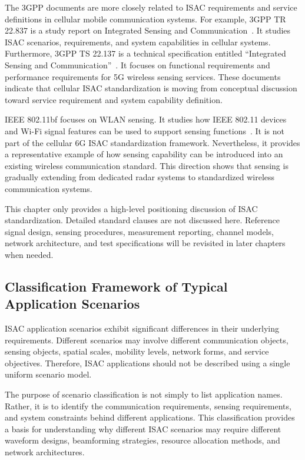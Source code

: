 The 3GPP documents are more closely related to ISAC requirements and service definitions in cellular mobile communication systems.
For example, 3GPP TR 22.837 is a study report on Integrated Sensing and Communication~\cite{3GPP_TR_22837}.
It studies ISAC scenarios, requirements, and system capabilities in cellular systems.
Furthermore, 3GPP TS 22.137 is a technical specification entitled ``Integrated Sensing and Communication''~\cite{3GPP_TS_22137}.
It focuses on functional requirements and performance requirements for 5G wireless sensing services.
These documents indicate that cellular ISAC standardization is moving from conceptual discussion toward service requirement and system capability definition.

IEEE 802.11bf focuses on \acs{WLAN} sensing.
It studies how IEEE 802.11 devices and Wi-Fi signal features can be used to support sensing functions~\cite{IEEE_80211bf}.
It is not part of the cellular 6G ISAC standardization framework.
Nevertheless, it provides a representative example of how sensing capability can be introduced into an existing wireless communication standard.
This direction shows that sensing is gradually extending from dedicated radar systems to standardized wireless communication systems.

This chapter only provides a high-level positioning discussion of ISAC standardization.
Detailed standard clauses are not discussed here.
Reference signal design, sensing procedures, measurement reporting, channel models, network architecture, and test specifications will be revisited in later chapters when needed.
 

\subsection{Classification Framework of Typical Application Scenarios}

ISAC application scenarios exhibit significant differences in their underlying requirements.
Different scenarios may involve different communication objects, sensing objects, spatial scales, mobility levels, network forms, and service objectives.
Therefore, ISAC applications should not be described using a single uniform scenario model.

The purpose of scenario classification is not simply to list application names.
Rather, it is to identify the communication requirements, sensing requirements, and system constraints behind different applications.
This classification provides a basis for understanding why different ISAC scenarios may require different waveform designs, beamforming strategies, resource allocation methods, and network architectures.

